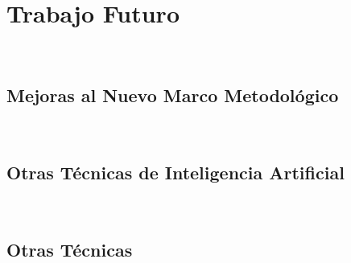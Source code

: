 
\section{Trabajo Futuro}~\hypertarget{sec:sec1120}{}
\label{sec:sec1120}



\subsection{Mejoras al Nuevo Marco Metodológico}~\hypertarget{sec:sec1121}{}
\label{sec:sec1121}



\subsection{Otras Técnicas de Inteligencia Artificial}~\hypertarget{sec:sec1122}{}
\label{sec:sec1122}



\subsection{Otras Técnicas}~\hypertarget{sec:sec1123}{}
\label{sec:sec1123}


